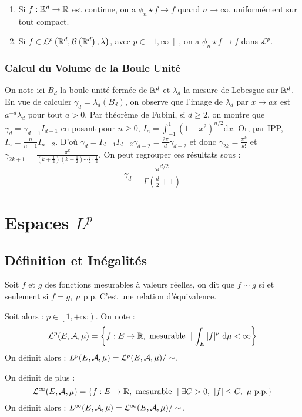 \documentclass{cours}
\begin{document}
\begin{proposition}
    \begin{enumerate}
        \item Si $f : \mathbb{R}^{d} \rightarrow \mathbb{R}$ est continue, on a $\phi_{n}\star f \rightarrow f$ quand $n \to \infty$, uniformément sur tout compact.
        \item Si $f \in \mathcal{L}^{p}\left(\mathbb{R}^{d}, \mathcal{B}\left(\mathbb{R}^{d}\right),\lambda\right)$, avec $p \in \left[1, \infty\right[$, on a $\phi_{n} \star f \to f$ dans $\mathcal{L}^{p}$.
    \end{enumerate}
\end{proposition}

\subsubsection{Calcul du Volume de la Boule Unité}
On note ici $B_{d}$ la boule unité fermée de $\mathbb{R}^{d}$ et $\lambda_{d}$ la mesure de Lebesgue sur $\mathbb{R}^{d}$. En vue de calculer $\gamma_{d} = \lambda_{d}\left(B_{d}\right)$, on observe que l'image de $\lambda_{d}$ par $x \mapsto ax$ est $a^{-d}\lambda_{d}$ pour tout $a > 0$.
Par théorème de Fubini, si $d \geq 2$, on montre que $\gamma_{d} = \gamma_{d-1} I_{d-1}$ en posant pour $n \geq 0$, $I_{n} = \int_{-1}^{1}\left(1 - x^{2}\right)^{n/2}\mathrm{d}x$.
Or, par IPP, $I_{n} = \frac{n}{n + 1}I_{n-2}$. D'où $\gamma_{d} = I_{d-1}I_{d-2}\gamma_{d-2} = \frac{2\pi}{d}\gamma_{d-2}$ et donc $\gamma_{2k} = \frac{\pi^{k}}{k!}$ et $\gamma_{2k+1} = \frac{\pi^{k}}{\left(k + \frac{1}{2}\right)\left(k - \frac{1}{2}\right)\cdots \frac{3}{2}\cdot\frac{1}{2}}$.
On peut regrouper ces résultats sous :
\[
    \gamma_{d} = \frac{\pi^{d/2}}{\Gamma\left(\frac{d}{2} + 1\right)}
\]

\section{Espaces $L^{p}$}
\subsection{Définition et Inégalités}
\begin{definition}
    Soit $f$ et $g$ des fonctions mesurables à valeurs réelles, on dit que $f \sim g$ si et seulement si $f = g, \ \mu$ p.p. C'est une relation d'équivalence.
\end{definition}

\begin{definition}
    Soit alors : $p \in \left[1, +\infty\right)$. On note :
    \[
        \mathcal{L}^{p}(E, \mathcal{A}, \mu) = \left\{f : E \rightarrow \mathbb{R}, \text{ mesurable } \mid \int_{E}\left|f\right|^{p}{\rm \, d} \mu < \infty \right\}
    \]
    On définit alors : $L^{p}(E, \mathcal{A}, \mu) = \mathcal{L}^{p}(E, \mathcal{A}, \mu)/\sim$.

    On définit de plus :
    \[
        \mathcal{L}^{\infty}(E, \mathcal{A}, \mu) = \left\{f : E \rightarrow \mathbb{R}, \text{ mesurable } \mid \exists C > 0,\ \left|f\right| \leq C,\ \mu \text{ p.p.}\right\}
    \]
    On définit alors : $L^{\infty}(E, \mathcal{A}, \mu) = \mathcal{L}^{\infty}(E, \mathcal{A}, \mu)/\sim$.
\end{definition}
\end{document}
